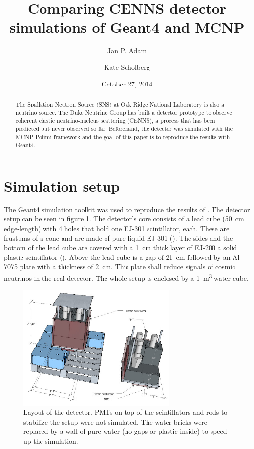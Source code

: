 \documentclass[12pt]{article}
\begin{document}
 

\title{Comparing CENNS detector simulations of Geant4 and MCNP} 

\author[1]{Jan P. Adam} 
\author[2]{Kate Scholberg} 
\date{October 27, 2014} 

\maketitle
\begin{abstract}
The Spallation Neutron Source (SNS) at Oak Ridge National Laboratory is also a neutrino source. The Duke Neutrino Group has built a detector prototype to observe coherent elastic neutrino-nucleus scattering (CENNS), a process that has been predicted but never observed so far. Beforehand, the detector was simulated with the MCNP-Polimi framework and the goal of this paper is to reproduce the results with Geant4.
\end{abstract}
\newpage

\section{Simulation setup}

The Geant4 simulation toolkit was used to reproduce the results of \cite{MCNP}. The detector setup can be seen in figure \ref{fig:detector}. The detector's core consists of a lead cube (\SI{50}{cm} edge-length) with 4 holes that hold one EJ-301 scintillator, each. These are frustums of a cone and are made of pure liquid EJ-301 (). The sides and the bottom of the lead cube are covered with a \SI{1}{cm} thick layer of EJ-200 a solid plastic scintillator (). Above the lead cube is a gap of \SI{21}{cm} followed by an Al-7075 plate with a thickness of \SI{2}{cm}. This plate shall reduce signals of cosmic neutrinos in the real detector. The whole setup is enclosed by a \SI{1}{m^3} water cube.

\begin{figure}[htbp]
	\centering
	\includegraphics[width=0.7\textwidth]{./pics/Det2.jpg}
	\caption{Layout of the detector. PMTs on top of the scintillators and rods to stabilize the setup were not simulated. The water bricks were replaced by a wall of pure water (no gaps or plastic inside) to speed up the simulation. }
	\label{fig:detector}
\end{figure}
\end{document}
